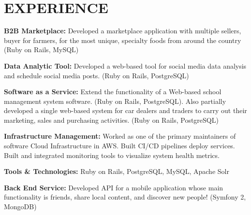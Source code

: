 \documentclass[letterpaper]{deedy-resume} %
\begin{document}
\begin{minipage}[t]{0.66\textwidth} %


\section{EXPERIENCE}

\sectionspace %



\begin{tightitemize}
\sectionspace
\sectionspace
\item \textbf{B2B Marketplace:}
Developed a marketplace application with multiple sellers, buyer for farmers, for the most unique, specialty foods from around the country (Ruby on Rails, MySQL)
\item \textbf{Data Analytic Tool:}
Developed a web-based tool for social media data analysis and schedule social media posts. (Ruby on Rails, PostgreSQL)
\item \textbf{Software as a Service:}
Extend the functionality of a Web-based school management system software. (Ruby on Rails, PostgreSQL). Also partially developed a single web-based system for car dealers and traders to carry out their marketing, sales and purchasing activities. (Ruby on Rails, PostgreSQL)
\item \textbf{Infrastructure Management:}
Worked as one of the primary maintainers of software Cloud Infrastructure in AWS. Built CI/CD pipelines deploy services. Built and integrated monitoring tools to visualize system health metrics. 
\item \textbf{Tools & Technologies:} Ruby on Rails, PostgreSQL, MySQL, Apache Solr
\end{tightitemize}

\sectionspace %


\begin{tightitemize}
\sectionspace
\item \textbf{Back End Service:}
Developed API for a mobile application whose main functionality is friends, share local content, and discover new people! (Symfony 2, MongoDB)


\end{tightitemize}
\end{minipage}
\end{document}
